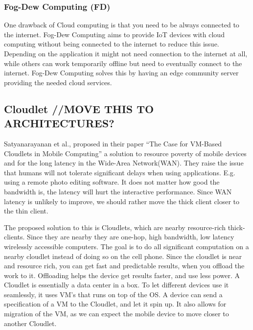 \subsubsection{Fog-Dew Computing (FD)}
One drawback of Cloud computing is that you need to be always connected to the internet. 
Fog-Dew Computing aims to provide IoT devices with cloud computing without being connected to the internet to reduce this issue. Depending on the application it might not need connection to the internet at all, while others can work temporarily offline but need to eventually connect to the internet. Fog-Dew Computing solves this by having an edge community server providing the needed cloud services. 

\subsection{Cloudlet //MOVE THIS TO ARCHITECTURES?}
Satyanarayanan et al., proposed in their paper “The Case for VM-Based Cloudlets in Mobile Computing”\cite{satyanarayanan_case_2009} a solution to resource poverty of mobile devices and for the long latency in the Wide-Area Network(WAN). They raise the issue that humans will not tolerate significant delays when using applications. E.g. using a remote photo editing software. It does not matter how good the bandwidth is, the latency will hurt the interactive performance. Since WAN latency is unlikely to improve, we should rather move the thick client closer to the thin client. 

The proposed solution to this is Cloudlets, which are nearby resource-rich thick-clients. Since they are nearby they are one-hop, high bandwidth, low latency wirelessly accessible computers. The goal is to do all significant computation on a nearby cloudlet instead of doing so on the cell phone. Since the cloudlet is near and resource rich, you can get fast and predictable results, when you offload the work to it. Offloading helps the device get results faster, and use less power. A Cloudlet is essentially a data center in a box. To let different devices use it seamlessly, it uses VM’s that runs on top of the OS. A device can send a specification of a VM to the Cloudlet, and let it spin up. It also allows for migration of the VM, as we can expect the mobile device to move closer to another Cloudlet.




